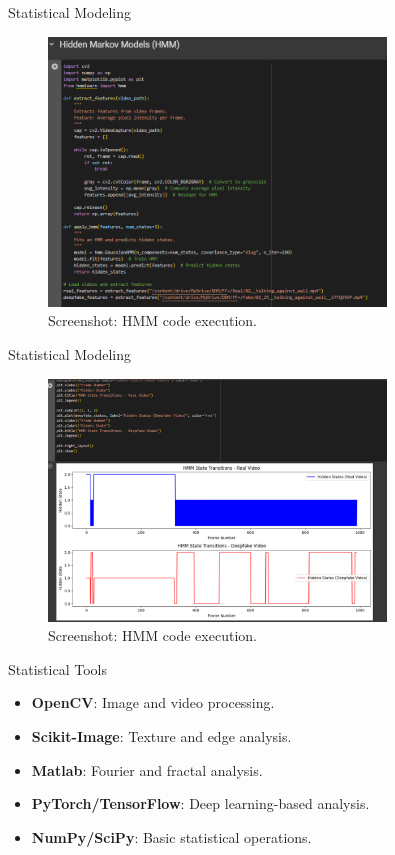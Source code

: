 \documentclass{beamer}
\begin{document}
\begin{frame}{Statistical Modeling}
    \begin{figure}
        \centering
        \includegraphics[width=0.8\textwidth]{hmm1.png} %
        \caption{Screenshot: HMM code execution.}
    \end{figure}
\end{frame} 

\begin{frame}{Statistical Modeling}
    \begin{figure}
        \centering
        \includegraphics[width=0.8\textwidth]{hmm2.png} %
        \caption{Screenshot: HMM code execution.}
    \end{figure}
\end{frame} 

\begin{frame}{Statistical Tools}
    \begin{itemize}
        \item \textbf{OpenCV}: Image and video processing.
        \item \textbf{Scikit-Image}: Texture and edge analysis.
        \item \textbf{Matlab}: Fourier and fractal analysis.
        \item \textbf{PyTorch/TensorFlow}: Deep learning-based analysis.
        \item \textbf{NumPy/SciPy}: Basic statistical operations.
    \end{itemize}
\end{frame}
\end{document}
